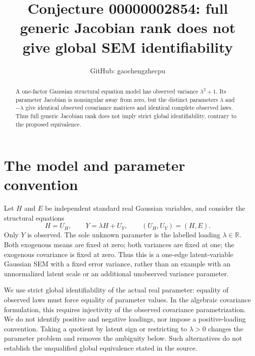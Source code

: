 \documentclass[11pt]{article}
\title{Conjecture 00000002854: full generic Jacobian rank does not give global SEM identifiability}
\author{GitHub: gaochengzhecpu}
\date{}
\begin{document}
\maketitle
\begin{abstract}
A one-factor Gaussian structural equation model has observed variance
$\lambda^2+1$. Its parameter Jacobian is nonsingular away from zero,
but the distinct parameters $\lambda$ and $-\lambda$ give identical
observed covariance matrices and identical complete observed laws.
Thus full generic Jacobian rank does not imply strict global
identifiability, contrary to the proposed equivalence.
\end{abstract}

\section*{The model and parameter convention}
Let $H$ and $E$ be independent standard real Gaussian variables, and
consider the structural equations
\[
 H=U_H,\qquad Y=\lambda H+U_Y,
 \qquad (U_H,U_Y)=(H,E).
\]
Only $Y$ is observed. The sole unknown parameter is the labelled loading
$\lambda\in\mathbb R$. Both exogenous means are fixed at zero; both
variances are fixed at one; the exogenous covariance is fixed at zero.
Thus this is a one-edge latent-variable Gaussian SEM with a fixed error
variance, rather than an example with an unnormalized latent scale or
an additional unobserved variance parameter.

We use strict global identifiability of the actual real parameter:
equality of observed laws must force equality of parameter values.
In the algebraic covariance formulation, this requires injectivity of
the observed covariance parametrization. We do not identify positive
and negative loadings, nor impose a positive-loading convention. Taking
a quotient by latent sign or restricting to $\lambda>0$ changes the
parameter problem and removes the ambiguity below. Such alternatives
do not establish the unqualified global equivalence stated in the source.
\end{document}
